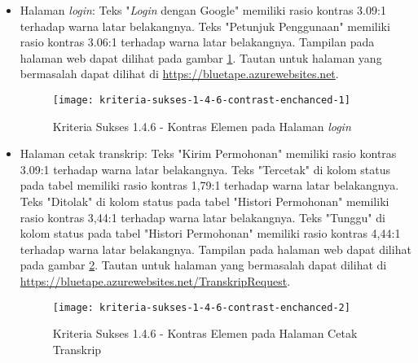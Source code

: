 \begin{itemize}
    \item Halaman \textit{login}: Teks "\textit{Login} dengan Google" memiliki rasio kontras 3.09:1 terhadap warna latar belakangnya. Teks "Petunjuk Penggunaan" memiliki rasio kontras 3.06:1 terhadap warna latar belakangnya. Tampilan pada halaman web dapat dilihat pada gambar \ref{fig:1.4.6_contrast_enchanced_1}. Tautan untuk halaman yang bermasalah dapat dilihat di \url{https://bluetape.azurewebsites.net}.
    \begin{figure}[H]
        \centering  
        \texttt{[image: kriteria-sukses-1-4-6-contrast-enchanced-1]}  
        \caption[Kriteria Sukses 1.4.6 - Kontras Elemen pada Halaman \textit{login}]{Kriteria Sukses 1.4.6 - Kontras Elemen pada Halaman \textit{login}}
        \label{fig:1.4.6_contrast_enchanced_1}  
    \end{figure} 

    \item Halaman cetak transkrip: Teks "Kirim Permohonan" memiliki rasio kontras 3.09:1 terhadap warna latar belakangnya. Teks "Tercetak" di kolom status pada tabel memiliki rasio kontras 1,79:1 terhadap warna latar belakangnya. Teks "Ditolak" di kolom status pada tabel "Histori Permohonan" memiliki rasio kontras 3,44:1 terhadap warna latar belakangnya. Teks "Tunggu" di kolom status pada tabel "Histori Permohonan" memiliki rasio kontras 4,44:1 terhadap warna latar belakangnya. Tampilan pada halaman web dapat dilihat pada gambar \ref{fig:1.4.6_contrast_enchanced_2}. Tautan untuk halaman yang bermasalah dapat dilihat di \url{https://bluetape.azurewebsites.net/TranskripRequest}.
    \begin{figure}[H]
        \centering  
        \texttt{[image: kriteria-sukses-1-4-6-contrast-enchanced-2]}  
        \caption[Kriteria Sukses 1.4.6 - Kontras Elemen pada Halaman Cetak Transkrip]{Kriteria Sukses 1.4.6 - Kontras Elemen pada Halaman Cetak Transkrip}
        \label{fig:1.4.6_contrast_enchanced_2}  
    \end{figure} 
    

\end{itemize}

